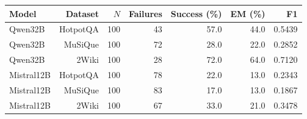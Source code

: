 \begin{tabular}{@{}lrrrrrr@{}}
\toprule
Model & Dataset & $N$ & Failures & Success (\%) & EM (\%) & F1 \\
\midrule
Qwen32B & HotpotQA & 100 & 43 & 57.0 & 44.0 & 0.5439 \\
Qwen32B & MuSiQue & 100 & 72 & 28.0 & 22.0 & 0.2852 \\
Qwen32B & 2Wiki & 100 & 28 & 72.0 & 64.0 & 0.7120 \\
Mistral12B & HotpotQA & 100 & 78 & 22.0 & 13.0 & 0.2343 \\
Mistral12B & MuSiQue & 100 & 83 & 17.0 & 13.0 & 0.1867 \\
Mistral12B & 2Wiki & 100 & 67 & 33.0 & 21.0 & 0.3478 \\
\bottomrule
\end{tabular}
